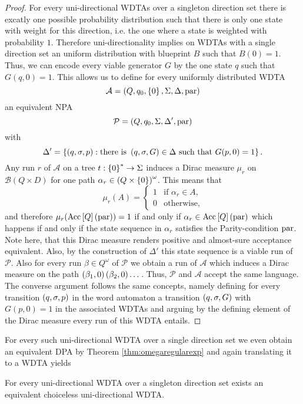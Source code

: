 \begin{proof}
  For every uni-directional \acp{WDTA} over a singleton direction set 
  there is excatly one possible probability distribution such that there is 
  only one state with weight for this direction, i.e. the one where a state is
  weighted with probability $1$. Therefore uni-directionality implies on 
  \acp{WDTA} with a single direction set an uniform distribution with blueprint
  $B$ such that $B(0) = 1$. Thus, we can encode every viable generator $G$ by 
  the one state $q$ such that $G(q,0) = 1$. This allows us to define for every 
  uniformly distributed \ac{WDTA}
  \begin{equation*}
    \mathcal{A} = \left(Q, q_{0}, \left\{0\right\}, \Sigma, \Delta, \operatorname{par}\right)
  \end{equation*}
  an equivalent \ac{NPA}
  \begin{equation*}
    \mathcal{P} = \left(Q, q_{0}, \Sigma, \Delta', \operatorname{par}\right)
  \end{equation*}
  with
  \begin{equation*}
    \Delta' = \left\{
      \left(q,\sigma,p\right): \text{there is }\left(q,\sigma,G\right)\in\Delta
        \text{ such that }G(p,0) = 1
    \right\}.
  \end{equation*}
  Any run $r$ of $\mathcal{A}$ on a tree $t:\left\{0\right\}^{*}\rightarrow\Sigma$ 
  induces a Dirac measure $\mu_{r}$ on $\mathcal{B}(Q\times D)$ for one path 
  $\alpha_{r}\in\left(Q\times \left\{0\right\}\right)^{\omega}$. This means that
  \begin{equation*}
    \mu_{r}(A) = \begin{cases}
      1&\text{if }\alpha_{r}\in A,\\
      0&\text{otherwise},
    \end{cases}
  \end{equation*}
  and therefore $\mu_{r}(\operatorname{Acc}\left[Q\right](\operatorname{par})) = 1$ if and only if
  $\alpha_{r}\in\operatorname{Acc}\left[Q\right](\operatorname{par})$ which happens if and only if the
  state sequence in $\alpha_{r}$ satisfies the Parity-condition $\operatorname{par}$. Note 
  here, that this Dirac measure renders positive and almost-sure acceptance 
  equivalent. Also, by the construction of $\Delta'$ this state sequence is a 
  viable run of $\mathcal{P}$. Also for every run $\beta\in Q^{\omega}$ of 
  $\mathcal{P}$ we obtain a run of $\mathcal{A}$ which induces a Dirac measure 
  on the path $\left(\beta_{1}, 0\right)\left(\beta_{2}, 0\right)\dots$. Thus, 
  $\mathcal{P}$ and $\mathcal{A}$ accept the same language. The converse 
  argument follows the same concepts, namely defining for every transition 
  $\left(q,\sigma, p\right)$ in the word automaton a transition $\left(q,\sigma,G\right)$ 
  with $G(p, 0) = 1$ in the associated \acp{WDTA} and arguing by the defining 
  element of the Dirac measure every run of this \ac{WDTA} entails.
\end{proof}
For every such uni-directional \ac{WDTA} over a single direction set we even 
obtain an equivalent \ac{DPA} by Theorem \ref{thm:omegaregularexp} and again
translating it to a \ac{WDTA} yields
\begin{corollary}
  For every uni-directional \ac{WDTA} over a singleton direction set exists
  an equivalent choiceless uni-directional \ac{WDTA}.
\end{corollary}

